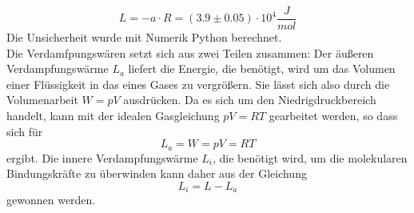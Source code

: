   \begin{equation*}
    L= - a \cdot R = (3.9 \pm 0.05) \cdot 10^4 \dfrac{J}{mol}
  \end{equation*}
  Die Unsicherheit wurde mit Numerik Python berechnet.\\
  Die Verdamfpungswären setzt sich aus zwei Teilen zusammen: Der äußeren Verdampfungswärme $L_a$
  liefert die Energie, die benötigt, wird um das Volumen einer Flüssigkeit in das eines 
  Gases zu vergrößern. Sie lässt sich also durch die Volumenarbeit $W = pV$ ausdrücken. Da es sich um 
  den Niedrigdruckbereich handelt, kann mit der idealen Gasgleichung $pV = RT$ gearbeitet 
  werden, so dass sich für 
  \begin{equation*}
  L_a = W = pV = RT
  \end{equation*}
  ergibt. Die innere Verdampfungswärme $L_i$, die benötigt wird, um die molekularen Bindungskräfte
  zu überwinden kann daher aus der Gleichung
  \begin{equation*}
  L_i = L - L_a
  \end{equation*}
  gewonnen werden.


